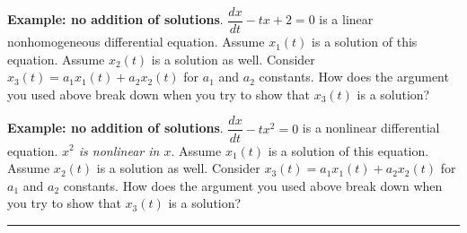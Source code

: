 \documentclass[12pt,letterpaper,noanswers]{exam}
\begin{document}
\noindent\textbf{Example: no addition of solutions}.
$\dfrac{dx}{dt} - t x + 2 = 0$ is a linear nonhomogeneous differential equation.  Assume $x_1(t)$ is a solution of this equation.  Assume $x_2(t)$ is a solution as well.  Consider $x_3(t) = a_1x_1(t) + a_2x_2(t)$ for $a_1$ and $a_2$ constants.  How does the argument you used above break down when you try to show that $x_3(t)$ is a solution?
\vspace{2in}

\noindent\textbf{Example: no addition of solutions}.
$\dfrac{dx}{dt} - t x^2 = 0$ is a nonlinear differential equation. \emph{$x^2$ is nonlinear in $x$}.  Assume $x_1(t)$ is a solution of this equation.  Assume $x_2(t)$ is a solution as well.  Consider $x_3(t) = a_1x_1(t) + a_2x_2(t)$ for $a_1$ and $a_2$ constants.  How does the argument you used above break down when you try to show that $x_3(t)$ is a solution?
\vspace{2in}




\vspace{0.2cm}
\hrule
\vspace{0.2cm}
\end{document}
